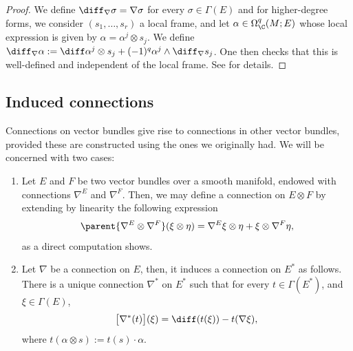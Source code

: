 \begin{proof}
    We define \(\diff_\nabla\sigma=\nabla \sigma\) for every \(\sigma \in \Gamma(E)\) and for higher-degree forms, we consider \((s_1, \ldots, s_r)\)  a local frame, and let \(\alpha \in \Omega_\C^q(M;E)\) whose local expression is given by \(\alpha = \alpha ^j \otimes s_j\). We define \(\diff_\nabla \alpha:=\diff \alpha^j \otimes s_j + (-1)^q \alpha ^j \wedge \diff_\nabla s_j \). One then checks that this is well-defined and independent of the local frame. See \parencite[Prop. 7.11]{lee_introCM} for details.
\end{proof}

\subsection{Induced connections} \label{sec_induced_connections}
Connections on vector bundles give rise to connections in other vector bundles, provided these are constructed using the ones we originally had. We will be concerned with two cases:
\begin{enumerate}
    \item Let \(E\) and \(F\) be two vector bundles over a smooth manifold, endowed with connections \(\nabla^E\) and \(\nabla^F\). Then, we may define a connection on \(E \otimes F\) by extending by linearity the following expression
    \begin{equation} \label{def_connection_product}
    \parent{\nabla^E \otimes \nabla^F}(\xi \otimes \eta)=\nabla^E \xi \otimes \eta + \xi \otimes \nabla^F \eta,
    \end{equation}
    as a direct computation shows.
    \item Let \(\nabla\) be a connection on \(E\), then, it induces a connection on \(E^*\) as follows. There is a unique connection \(\nabla^*\) on \(E^*\) such that for every \(t \in \Gamma(E^*)\), and \(\xi \in \Gamma(E)\), 
    \begin{equation} \label{def_connection_dual}
        \big[\nabla^*(t) \big](\xi) = \diff (t (\xi)) - t(\nabla \xi),
    \end{equation}
    where \(t(\alpha \otimes s):=t(s) \cdot \alpha\). 
\end{enumerate}

